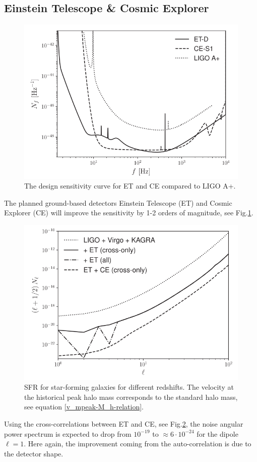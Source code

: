 \subsection{Einstein Telescope \& Cosmic Explorer}
\begin{figure}[h]
    \centering
    \includegraphics[width=0.7\linewidth]{Images/ET_CE_frequency_noise.png}
    \caption{The design sensitivity curve for ET and CE compared to LIGO A+.}
    \label{ET_sensitivity}
\end{figure} 

The planned ground-based detectors Einstein Telescope (ET) and Cosmic Explorer (CE) will improve the sensitivity by 1-2 orders of magnitude, see Fig.\ref{ET_sensitivity}.

\begin{figure}[h]
    \centering
    \includegraphics[width=0.7\linewidth]{Images/et_ce_Cl_noise.png}
    \caption{SFR for star-forming galaxies for different redshifts. The velocity at the historical peak halo mass corresponds to the standard halo mass, see equation \ref{v_mpeak-M_h-relation}.}
    \label{ET_Cl}
\end{figure} 

Using the cross-correlations between ET and CE, see Fig.\ref{ET_Cl}, the noise angular power spectrum is expected to drop from $10^{-19}$ to $\approx 6\cdot 10^{-24}$ for the dipole $\ell =1$. Here again, the improvement coming from the auto-correlation is due to the detector shape.



